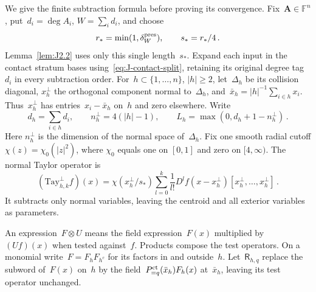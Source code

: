 We give the finite subtraction formula before proving its convergence. Fix~$\boldsymbol A\in\mathbb F^n$, put~$d_i=\deg A_i$, $W=\sum_id_i$, and choose
\begin{equation*}
r_* =\min(1,\delta_W^{\rm pres}),\qquad s_*=r_*/4\,.
\end{equation*}
Lemma~\ref{lem:J2.2} uses only this single length~$s_*$. Expand each input in the contact stratum bases using~\eqref{eq:J-contact-split}, retaining its original degree tag~$d_i$ in every subtraction order. For~$h\subset\{1,\ldots,n\}$, $|h|\ge2$, let~$\Delta_h$ be its collision diagonal, $x_h^\perp$ the orthogonal component normal to~$\Delta_h$, and~$\bar x_h=|h|^{-1}\sum_{i\in h}x_i$. Thus~$x_h^\perp$ has entries~$x_i-\bar x_h$ on~$h$ and zero elsewhere. Write
\begin{equation*}
d_h=\sum_{i\in h}d_i,\qquad n^\perp_h=4(|h|-1),\qquad L_h=\max(0,d_h+1-n^\perp_h)\,.
\end{equation*}
Here $n^\perp_h$ is the dimension of the normal space of~$\Delta_h$. Fix one smooth radial cutoff $\chi(z)=\chi_0(|z|^2)$, where $\chi_0$ equals one on $[0,1]$ and zero on $[4,\infty)$. The normal Taylor operator is
\begin{equation}\label{eq:J-normal-Taylor}
(\mathrm{Tay}_{h,k}^{\perp}f)(x)=\chi(x_h^\perp/s_*)
\sum_{l=0}^k\frac1{l!}D^lf(x-x_h^\perp)[x_h^\perp,\ldots,x_h^\perp]\,.
\end{equation}
It subtracts only normal variables, leaving the centroid and all exterior variables as parameters.

An expression~$F\otimes U$ means the field expression~$F(x)$ multiplied by~$(Uf)(x)$ when tested against~$f$. Products compose the test operators. On a monomial write~$F=F_hF_{h^c}$ for its factors in and outside~$h$. Let~$\mathsf R_{h,q}$ replace the subword of~$F(x)$ on~$h$ by the field~$P_{=q}^{\rm ct}(\bar x_h)F_h(x)$ at~$\bar x_h$, leaving its test operator unchanged.

